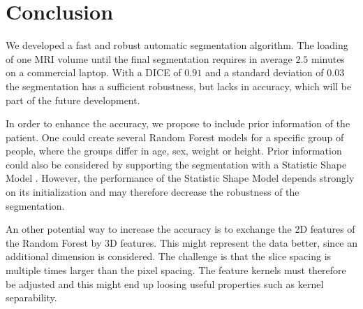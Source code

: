\section{Conclusion}
We developed a fast and robust automatic segmentation algorithm. The loading of one MRI volume until the final segmentation requires in average $2.5$ minutes on a commercial laptop. With a DICE of $0.91$ and a standard deviation of $0.03$ the segmentation has a sufficient robustness, but lacks in accuracy, which will be part of the future development.

In order to enhance the accuracy, we propose to include prior information of the patient. One could create several Random Forest models for a specific group of people, where the groups differ in age, sex, weight or height. Prior information could also be considered by supporting the segmentation with a Statistic Shape Model \cite{heimann2009statistical}. However, the performance of the Statistic Shape Model depends strongly on its initialization and may therefore decrease the robustness of the segmentation.

An other potential way to increase the accuracy is to exchange the 2D features of the Random Forest by 3D features. This might represent the data better, since an additional dimension is considered. The challenge is that the slice spacing is multiple times larger than the pixel spacing. The feature kernels must therefore be adjusted and this might end up loosing useful properties such as kernel separability.
